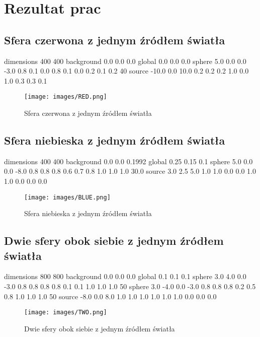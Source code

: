 \documentclass[11pt,a4paper,titlepage]{article}
\begin{document}
\newpage
\section{Rezultat prac}
\subsection{Sfera czerwona z jednym źródłem światła}
dimensions	400 400\newline
background	0.0 0.0 0.0\newline
global		0.0 0.0 0.0\newline
sphere  	5.0	0.0 0.0 -3.0 0.8 0.1 0.0 0.8 0.1 0.0 0.2 0.1 0.2 40\newline
source		-10.0 0.0 10.0 0.2 0.2 0.2 1.0 0.0 1.0 0.3 0.3 0.1\newline
\begin{figure}[H]
\centering
\texttt{[image: images/RED.png]}
\caption{Sfera czerwona z jednym źródłem światła}
\label{fig:eggWithLight}
\end{figure}

\newpage
\subsection{Sfera niebieska z jednym źródłem światła}
dimensions	400 400\newline
background	0.0 0.0 0.1992\newline
global		0.25 0.15 0.1\newline
sphere  	5.0 0.0 0.0 -8.0 0.8 0.8 0.8 0.6 0.7 0.8 1.0 1.0 1.0 30.0\newline
source		3.0 2.5 5.0 1.0 1.0 0.0 0.0 1.0 1.0 0.0 0.0 0.0\newline
\begin{figure}[H]
\centering
\texttt{[image: images/BLUE.png]}
\caption{Sfera niebieska z jednym źródłem światła}
\label{fig:eggWithLight}
\end{figure}

\newpage
\subsection{Dwie sfery obok siebie z jednym źródłem światła}
dimensions	800 800\newline
background	0.0 0.0 0.0\newline
global		0.1 0.1 0.1\newline
sphere  	3.0	4.0 0.0 -3.0 0.8 0.8 0.8 0.8 0.1 0.1 1.0 1.0 1.0 50\newline
sphere  	3.0 -4.0 0.0 -3.0 0.8 0.8 0.8 0.2 0.5 0.8 1.0 1.0 1.0 50\newline
source		-8.0 0.0 8.0 1.0 1.0 1.0 1.0 1.0 1.0 0.0 0.0 0.0\newline
\begin{figure}[H]
\centering
\texttt{[image: images/TWO.png]}
\caption{Dwie sfery obok siebie z jednym źródłem światła}
\label{fig:eggWithLight}
\end{figure}
\end{document}
